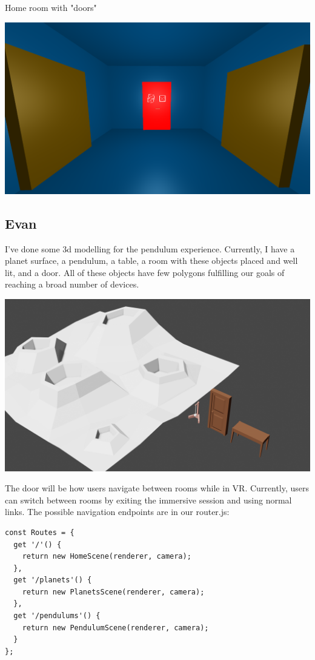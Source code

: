 \documentclass[onecolumn, draftclsnofoot,10pt, compsoc]{IEEEtran}
\begin{document}
Home room with "doors"

\includegraphics[width=\linewidth]{images/doors.png}

\subsection{Evan}
I've done some 3d modelling for the pendulum experience.  Currently, I have a planet surface, a pendulum, a table, a room with these objects placed and well lit, and a door.  All of these objects have few polygons fulfilling our goals of reaching a broad number of devices.

\includegraphics[width=\linewidth]{images/3d_objects.png}

The door will be how users navigate between rooms while in VR.  Currently, users can switch between rooms by exiting the immersive session and using normal links.  The possible navigation endpoints are in our router.js:

\begin{lstlisting}
const Routes = {
  get '/'() {
    return new HomeScene(renderer, camera);
  },
  get '/planets'() {
    return new PlanetsScene(renderer, camera);
  },
  get '/pendulums'() {
    return new PendulumScene(renderer, camera);
  }
};
\end{lstlisting}
\end{document}
